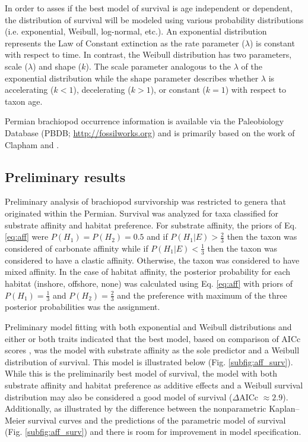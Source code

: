 \documentclass[12pt,letterpaper]{article}
\begin{document}
In order to asses if the best model of survival is age independent or dependent, the distribution of survival will be modeled using various probability distributions (i.e. exponential, Weibull, log-normal, etc.). An exponential distribution represents the Law of Constant extinction as the rate parameter (\(\lambda\)) is constant with respect to time. In contrast, the Weibull distribution has two parameters, scale (\(\lambda\)) and shape (\(k\)). The scale parameter analogous to the \(\lambda\) of the exponential distribution while the shape parameter describes whether \(\lambda\) is accelerating (\(k < 1\)), decelerating (\(k > 1\)), or constant (\(k = 1\)) with respect to taxon age.

Permian brachiopod occurrence information is available via the Paleobiology Database (PBDB; \url{http://fossilworks.org}) and is primarily based on the work of Clapham \citep{Clapham2006,Clapham2008a,Clapham2007a,Clapham2012,Clapham2007} and \citet{Waterhouse1987}.


\subsection{Preliminary results}
Preliminary analysis of brachiopod survivorship was restricted to genera that originated within the Permian. Survival was analyzed for taxa classified for substrate affinity and habitat preference. For substrate affinity, the priors of Eq. \ref{eq:aff} were \(P(H_{1}) = P(H_{2}) = 0.5\) and if \(P(H_{1}|E) > \frac{2}{3}\) then the taxon was considered of carbonate affinity while if \(P(H_{1}|E) < \frac{1}{3}\) then the taxon was considered to have a clastic affinity. Otherwise, the taxon was considered to have mixed affinity. In the case of habitat affinity, the posterior probability for each habitat (inshore, offshore, none) was calculated using Eq. \ref{eq:aff} with priors of \(P(H_{1}) = \frac{1}{3}\) and \(P(H_{2}) = \frac{2}{3}\) and the preference with maximum of the three posterior probabilities was the assignment.

Preliminary model fitting with both exponential and Weibull distributions and either or both traits indicated that the best model, based on comparison of AICc scores \citep{Hurvich1989,Akaike1974,Burnham2002a}, was the model with substrate affinity as the sole predictor and a Weibull distribution of survival. This model is illustrated below (Fig. \ref{subfig:aff_surv}). While this is the preliminarily best model of survival, the model with both substrate affinity and habitat preference as additive effects and a Weibull survival distribution may also be considered a good model of survival (\(\Delta\)AICc \(\approx 2.9\)). Additionally, as illustrated by the difference between the nonparametric Kaplan--Meier survival curves and the predictions of the parametric model of survival (Fig. \ref{subfig:aff_surv}) and there is room for improvement in model specification.
\end{document}
